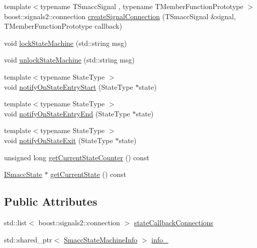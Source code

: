 \begin{DoxyCompactItemize}
\item 
{\footnotesize template$<$typename T\+Smacc\+Signal , typename T\+Member\+Function\+Prototype $>$ }\\boost\+::signals2\+::connection \hyperlink{classsmacc_1_1ISmaccStateMachine_a9248dd505790b9d46d6dbebeb31bf5f8}{create\+Signal\+Connection} (T\+Smacc\+Signal \&signal, T\+Member\+Function\+Prototype callback)
\item 
void \hyperlink{classsmacc_1_1ISmaccStateMachine_a5c8d4c9a4b11c7950266a00e48080ce3}{lock\+State\+Machine} (std\+::string msg)
\item 
void \hyperlink{classsmacc_1_1ISmaccStateMachine_ae2e3ceb87bfe3f9d8bf320e36071fdc7}{unlock\+State\+Machine} (std\+::string msg)
\item 
{\footnotesize template$<$typename State\+Type $>$ }\\void \hyperlink{classsmacc_1_1ISmaccStateMachine_aeec54e997d715b105ebfeb5caadc4fbf}{notify\+On\+State\+Entry\+Start} (State\+Type $\ast$state)
\item 
{\footnotesize template$<$typename State\+Type $>$ }\\void \hyperlink{classsmacc_1_1ISmaccStateMachine_a856cf2d25d84659b974cccfbf44aeec9}{notify\+On\+State\+Entry\+End} (State\+Type $\ast$state)
\item 
{\footnotesize template$<$typename State\+Type $>$ }\\void \hyperlink{classsmacc_1_1ISmaccStateMachine_a9d2bd4aca0c80a1ec22c5f95e7c38db8}{notify\+On\+State\+Exit} (State\+Type $\ast$state)
\item 
unsigned long \hyperlink{classsmacc_1_1ISmaccStateMachine_a03966e531cefc1e096bffa46111871d2}{get\+Current\+State\+Counter} () const 
\item 
\hyperlink{classsmacc_1_1ISmaccState}{I\+Smacc\+State} $\ast$ \hyperlink{classsmacc_1_1ISmaccStateMachine_a8c39c1eedb7236e67739dab6e2229511}{get\+Current\+State} () const 
\end{DoxyCompactItemize}
\subsection*{Public Attributes}
\begin{DoxyCompactItemize}
\item 
std\+::list$<$ boost\+::signals2\+::connection $>$ \hyperlink{classsmacc_1_1ISmaccStateMachine_aaf98bb0edaa5d8c84767e4acfad3548d}{state\+Callback\+Connections}
\item 
std\+::shared\+\_\+ptr$<$ \hyperlink{classsmacc_1_1SmaccStateMachineInfo}{Smacc\+State\+Machine\+Info} $>$ \hyperlink{classsmacc_1_1ISmaccStateMachine_a5ec3201cbddab4f062f572fb33021041}{info\+\_\+}
\end{DoxyCompactItemize}

